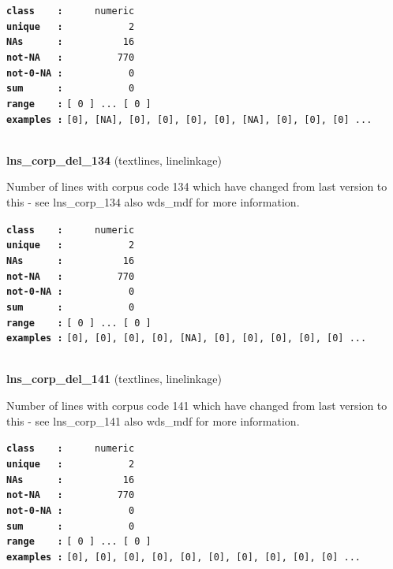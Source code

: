\documentclass[]{article}
\begin{document}
\textbf{\texttt{class\ \ \ \ :}} \texttt{~~~~~numeric}\\
\textbf{\texttt{unique\ \ \ :}} \texttt{~~~~~~~~~~~2}\\
\textbf{\texttt{NAs\ \ \ \ \ \ :}} \texttt{~~~~~~~~~~16}\\
\textbf{\texttt{not-NA\ \ \ :}} \texttt{~~~~~~~~~770}\\
\textbf{\texttt{not-0-NA\ :}} \texttt{~~~~~~~~~~~0}\\
\textbf{\texttt{sum\ \ \ \ \ \ :}} \texttt{~~~~~~~~~~~0}\\
\textbf{\texttt{range\ \ \ \ :}}
\texttt{{[}\ 0\ {]}\ ...\ {[}\ 0\ {]}}\\
\textbf{\texttt{examples\ :}}
\texttt{{[}0{]},\ {[}NA{]},\ {[}0{]},\ {[}0{]},\ {[}0{]},\ {[}0{]},\ {[}NA{]},\ {[}0{]},\ {[}0{]},\ {[}0{]}\ ...}\\

~

\textbf{lns\_corp\_del\_134} (textlines, linelinkage)

Number of lines with corpus code 134 which have changed from last
version to this - see lns\_corp\_134 also wds\_mdf for more information.

\textbf{\texttt{class\ \ \ \ :}} \texttt{~~~~~numeric}\\
\textbf{\texttt{unique\ \ \ :}} \texttt{~~~~~~~~~~~2}\\
\textbf{\texttt{NAs\ \ \ \ \ \ :}} \texttt{~~~~~~~~~~16}\\
\textbf{\texttt{not-NA\ \ \ :}} \texttt{~~~~~~~~~770}\\
\textbf{\texttt{not-0-NA\ :}} \texttt{~~~~~~~~~~~0}\\
\textbf{\texttt{sum\ \ \ \ \ \ :}} \texttt{~~~~~~~~~~~0}\\
\textbf{\texttt{range\ \ \ \ :}}
\texttt{{[}\ 0\ {]}\ ...\ {[}\ 0\ {]}}\\
\textbf{\texttt{examples\ :}}
\texttt{{[}0{]},\ {[}0{]},\ {[}0{]},\ {[}0{]},\ {[}NA{]},\ {[}0{]},\ {[}0{]},\ {[}0{]},\ {[}0{]},\ {[}0{]}\ ...}\\

~

\textbf{lns\_corp\_del\_141} (textlines, linelinkage)

Number of lines with corpus code 141 which have changed from last
version to this - see lns\_corp\_141 also wds\_mdf for more information.

\textbf{\texttt{class\ \ \ \ :}} \texttt{~~~~~numeric}\\
\textbf{\texttt{unique\ \ \ :}} \texttt{~~~~~~~~~~~2}\\
\textbf{\texttt{NAs\ \ \ \ \ \ :}} \texttt{~~~~~~~~~~16}\\
\textbf{\texttt{not-NA\ \ \ :}} \texttt{~~~~~~~~~770}\\
\textbf{\texttt{not-0-NA\ :}} \texttt{~~~~~~~~~~~0}\\
\textbf{\texttt{sum\ \ \ \ \ \ :}} \texttt{~~~~~~~~~~~0}\\
\textbf{\texttt{range\ \ \ \ :}}
\texttt{{[}\ 0\ {]}\ ...\ {[}\ 0\ {]}}\\
\textbf{\texttt{examples\ :}}
\texttt{{[}0{]},\ {[}0{]},\ {[}0{]},\ {[}0{]},\ {[}0{]},\ {[}0{]},\ {[}0{]},\ {[}0{]},\ {[}0{]},\ {[}0{]}\ ...}\\
\end{document}
